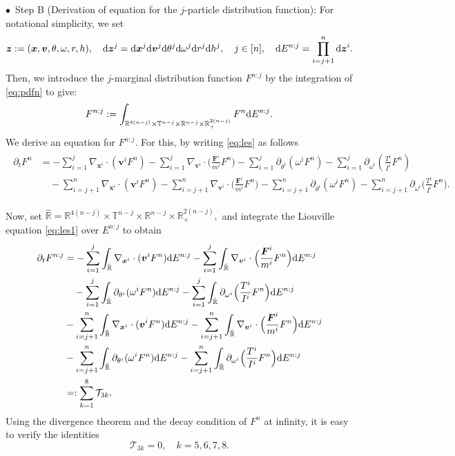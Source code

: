 \documentclass[a4paper,11pt]{article}
\numberwithin{equation}{section}
\theoremstyle{definition}
\newcommand{\bfx}{\boldsymbol{x}}
\newcommand{\bfz}{\boldsymbol{z}}
\newcommand{\bfv}{\boldsymbol{v}}
\newcommand{\bfF}{\boldsymbol{F}}
\newcommand{\bbr}{\mathbb R}
\def\d{{  \rm d}}
\newcommand{\T}{\mathcal{T}}
\begin{document}
\noindent $\bullet$~Step B (Derivation of equation  for the $j$-particle distribution function):  For notational simplicity, we set 
\[ \bfz := (\bfx,\bfv,\theta, \omega, r,h)    , \quad   \d\bfz^j = \d\bfx^j \d\bfv^j \d \theta^j \d \omega^j \d r^j \d h^j, \quad j \in [n], \quad  \d E^{n:j} = \prod_{i=j+1}^n\d\bfz^i. \]
Then, we introduce the $j$-marginal distribution function $F^{n:j}$ by the integration of \eqref{eq:pdfn} to give:
%
\[ F^{n:j}  := \int_{\bbr^{4(n-j)}\times \mathbb{T}^{n-j}\times \bbr^{n-j} \times \bbr_+^{2(n-j)}} F^{n} \d E^{n:j}. \]
%
We derive an equation for $ F^{n:j}$. For this,  by writing \eqref{eq:les} as follows
\begin{align}
\begin{aligned} \label{eq:les1}
 \partial_t F^n &= -\sum_{i=1}^j   \nabla_{\bfx^i} \cdot  (\bfv^i F^n) - \sum_{i=1}^{j} \nabla_{\bfv^i} \cdot \Big ( \frac{\bfF^i}{m^i} F^n \Big ) - \sum_{i=1}^{j}  \partial_{\theta^i} (\omega^iF^n) - \sum_{i=1}^{j} \partial_{\omega^i} ( \frac{T^i}{I^i} F^n)  \\
 & \quad - \sum_{i=j+1}^{n}  \nabla_{\bfx^i} \cdot ( \bfv^i F^n) - \sum_{i=j+1}^{n} \nabla_{\bfv^i} \cdot \Big ( \frac{\bfF^i}{m^i} F^n \Big ) - \sum_{i=j+1}^{n}  \partial_{\theta^i} (\omega^iF^n) - \sum_{i=j+1}^{n} \partial_{\omega^i} \Big( \frac{T^i}{I^i} F^n \Big).
\end{aligned}
\end{align}
%

Now, set $\hat{\bbr} = \bbr^{4(n-j)}\times \mathbb{T}^{n-j}\times \bbr^{n-j} \times \bbr_+^{2(n-j)},$ and integrate the Liouville equation \eqref{eq:les1} over $ E^{n:j}$
to obtain
\begin{align}
\begin{aligned} \label{eq:les2}
\partial_t F^{n:j} & =  -\sum_{i=1}^j    \int_{\hat{\bbr}}  \nabla_{\bfx^i} \cdot  (\bfv^i F^n) \d E^{n:j} - \sum_{i=1}^{j} \int_{\hat{\bbr}} \nabla_{\bfv^i} \cdot \Big( \frac{\bfF^i}{m^i} F^n \Big) \d E^{n:j} \\
%
& \quad -\sum_{i=1}^j  \int_{\hat{\bbr}}  \partial_{\theta^i} (\omega^iF^n) \d E^{n:j} - \sum_{i=1}^{j} \int_{\hat{\bbr}}  \partial_{\omega^i} \Big( \frac{T^i}{I^i} F^n \Big)   \d E^{n:j} \\
%
& -  \sum_{i=j+1}^{n}  \int_{\hat{\bbr}}  \nabla_{\bfx^i} \cdot ( \bfv^i F^n) \d E^{n:j} - \sum_{i=j+1}^{n} \int_{\hat{\bbr}} \nabla_{\bfv^i} \cdot \Big( \frac{\bfF^i}{m^i} F^n \Big) \d E^{n:j} \\
%
& -  \sum_{i=j+1}^{n}  \int_{\hat{\bbr}}  \partial_{\theta^i} (\omega^iF^n) \d E^{n:j} - \sum_{i=j+1}^{n} \int_{\hat{\bbr}} \partial_{\omega^i} \Big( \frac{T^i}{I^i} F^n \Big)  \d E^{n:j} \\
&=: \sum_{k=1}^8 \T_{3k}.
\end{aligned}
\end{align}
Using the divergence theorem and the decay condition of $F^n$ at infinity, it is easy to verify the identities
\[
\T_{3k} = 0, \quad k=5,6,7,8.
\]
\end{document}
